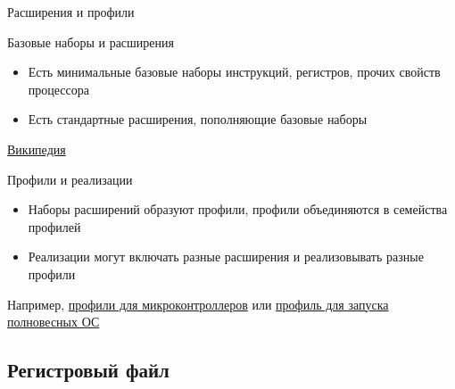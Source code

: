 \documentclass[xetex,aspectratio=43]{beamer}
\begin{document}
\begin{frame}{Расширения и профили}
    \begin{block}{Базовые наборы и расширения}
        \begin{itemize}
            \item Есть минимальные базовые наборы инструкций, регистров, прочих свойств процессора
            \item Есть стандартные расширения, пополняющие базовые наборы
        \end{itemize}
        \href{https://en.wikipedia.org/wiki/RISC-V\#ISA\_base\_and\_extensions}{Википедия}
    \end{block}
    \begin{block}{Профили и реализации}
        \begin{itemize}
            \item Наборы расширений образуют профили, профили объединяются в семейства профилей
            \item Реализации могут включать разные расширения и реализовывать разные профили
        \end{itemize}
        Например, \href{https://github.com/riscv/riscv-profiles/blob/main/rvm23-profile.adoc}{профили для микроконтроллеров} или \href{https://github.com/riscv/riscv-profiles/blob/main/rva23-profile.adoc}{профиль для запуска полновесных ОС}
    \end{block}
\end{frame}

\subsection{Регистровый файл}
\end{document}
